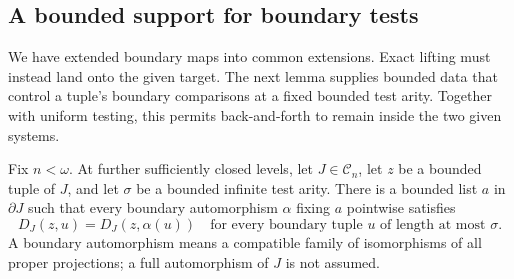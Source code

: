 \subsection{A bounded support for boundary tests}

We have extended boundary maps into common extensions.  Exact lifting
must instead land onto the given target.  The next lemma supplies bounded
data that control a tuple's boundary comparisons at a fixed bounded test
arity.  Together with uniform testing, this permits back-and-forth to
remain inside the two given systems.

\begin{lemma}
\label{iter:boundary-fixed-parameters}
Fix $n<\omega$. At further sufficiently closed levels,
let $J\in\mathcal C_n$, let $z$ be a bounded tuple of
$J$, and let $\sigma$ be a bounded infinite test arity.
There is a bounded list $a$ in $\partial J$ such that
every boundary automorphism $\alpha$ fixing $a$ pointwise
satisfies
\[
 D_J(z,u)=D_J(z,\alpha(u))
 \quad\text{for every boundary tuple }u
 \text{ of length at most }\sigma.
 \tag{F}
\]
A boundary automorphism means a compatible family of
isomorphisms of all proper projections; a full
automorphism of $J$ is not assumed.
\end{lemma}

